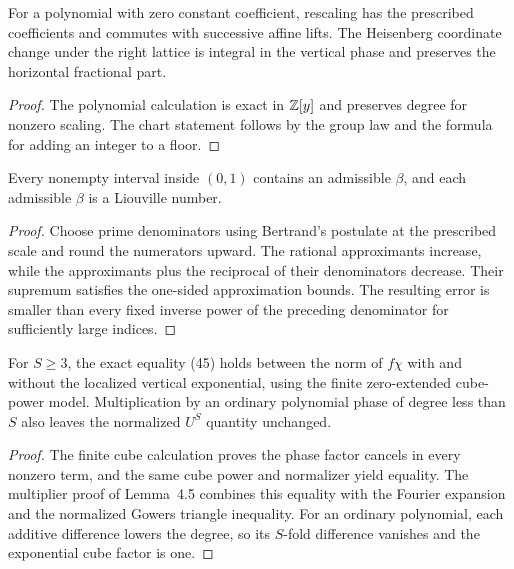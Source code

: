 \begin{lemma}\label{checked-rescaling}
\leanok
For a polynomial with zero constant coefficient, rescaling has the
prescribed coefficients and commutes with successive affine lifts.
The Heisenberg coordinate change under the right lattice is integral
in the vertical phase and preserves the horizontal fractional part.
\end{lemma}
\begin{proof}
\leanok
The polynomial calculation is exact in $\mathbb Z[y]$ and preserves degree
for nonzero scaling. The chart statement follows by the group law
and the formula for adding an integer to a floor.
\end{proof}


\begin{lemma}\label{checked-beta}
\leanok
Every nonempty interval inside $(0,1)$ contains an admissible
$\beta$, and each admissible $\beta$ is a Liouville number.
\end{lemma}
\begin{proof}
\leanok
Choose prime denominators using Bertrand's postulate at the
prescribed scale and round the numerators upward.
The rational approximants increase, while the approximants
plus the reciprocal of their denominators decrease. Their
supremum satisfies the one-sided approximation bounds.
The resulting error is smaller than every fixed inverse power
of the preceding denominator for sufficiently large indices.
\end{proof}

\begin{lemma}\label{checked-cube}
\leanok
For $S\ge3$, the exact equality (45) holds between the norm of
$f\chi$ with and without the localized vertical exponential,
using the finite zero-extended cube-power model. Multiplication
by an ordinary polynomial phase of degree less than $S$ also leaves
the normalized $U^S$ quantity unchanged.
\end{lemma}
\begin{proof}
\leanok
The finite cube calculation proves the phase factor cancels in every
nonzero term, and the same cube power and normalizer yield equality.
The multiplier proof of Lemma~4.5 combines this equality with the
Fourier expansion and the normalized Gowers triangle inequality.
For an ordinary polynomial, each additive difference lowers the
degree, so its $S$-fold difference vanishes and the exponential cube
factor is one.
\end{proof}

